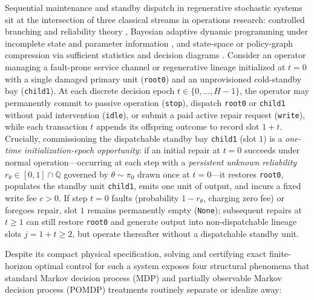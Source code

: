 \documentclass[11pt,letterpaper]{article}
\begin{document}
Sequential maintenance and standby dispatch in regenerative stochastic
systems sit at the intersection of three classical streams in operations
research: controlled branching and reliability theory
\citep{harris1963, sevastyanov1971, athreyaNey1972, barlowProschan1975, pliska1976, rothblumWhittle1982},
Bayesian adaptive dynamic programming under incomplete state and
parameter information
\citep{bellman1957, bellman1961, astrom1965, rieder1975, bertsekasShreve1978, easleyKiefer1988},
and state-space or policy-graph compression via sufficient statistics
and decision diagrams
\citep{striebel1965, dynkin1978, bryant1986, boutilier2000, bergman2016}.
Consider an operator managing a fault-prone service channel or
regenerative lineage initialized at \(t = 0\) with a single damaged
primary unit (\texttt{root0}) and an unprovisioned cold-standby bay
(\texttt{child1}). At each discrete decision epoch
\(t \in \{0, \dots, H-1\}\), the operator may permanently commit to
passive operation (\texttt{stop}), dispatch \texttt{root0} or
\texttt{child1} without paid intervention (\texttt{idle}), or submit a
paid active repair request (\texttt{write}), while each transaction
\(t\) appends its offspring outcome to record slot \(1 + t\). Crucially,
commissioning the dispatchable standby bay \texttt{child1} (slot \(1\))
is a \emph{one-time initialization-epoch opportunity}: if an initial
repair at \(t = 0\) succeeds under normal operation---occurring at each
step with a \emph{persistent unknown reliability}
\(r_\theta \in [0,1] \cap \mathbb{Q}\) governed by \(\theta \sim \pi_0\)
drawn once at \(t = 0\)---it restores \texttt{root0}, populates the
standby unit \texttt{child1}, emits one unit of output, and incurs a
fixed write fee \(c > 0\). If step \(t = 0\) faults (probability
\(1 - r_\theta\), charging zero fee) or foregoes repair, slot \(1\)
remains permanently empty (\texttt{None}); subsequent repairs at
\(t \ge 1\) can still restore \texttt{root0} and generate output into
non-dispatchable lineage slots \(j = 1 + t \ge 2\), but operate
thereafter without a dispatchable standby unit.

Despite its compact physical specification, solving and certifying exact
finite-horizon optimal control for such a system exposes four structural
phenomena that standard Markov decision process (MDP) and partially
observable Markov decision process (POMDP) treatments routinely separate
or idealize away:
\end{document}

